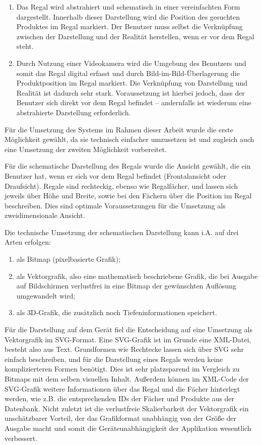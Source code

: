 \begin{enumerate}
	\item Das Regal wird abstrahiert und schematisch in einer vereinfachten Form dargestellt. Innerhalb dieser Darstellung wird die Position des gesuchten Produktes im Regal markiert. Der Benutzer muss selbst die Verknüpfung zwischen der Darstellung und der Realität herstellen, wenn er vor dem Regal steht.
	\item Durch Nutzung einer Videokamera wird die Umgebung des Benutzers und somit das Regal digital erfasst und durch Bild-im-Bild-Überlagerung die Produktposition im Regal markiert. Die Verknüpfung von Darstellung und Realität ist dadurch sehr stark. Voraussetzung ist hierbei jedoch, dass der Benutzer sich direkt vor dem Regal befindet -- andernfalls ist wiederum eine abstrahierte Darstellung erforderlich.
\end{enumerate}

Für die Umsetzung des Systems im Rahmen dieser Arbeit wurde die erste Möglichkeit gewählt, da sie technisch einfacher umzusetzen ist und zugleich auch eine Umsetzung der zweiten Möglichkeit vorbereitet.

Für die schematische Darstellung des Regals wurde die Ansicht gewählt, die ein Benutzer hat, wenn er sich vor dem Regal befindet (Frontalansicht oder Draufsicht). Regale sind rechteckig, ebenso wie Regalfächer, und lassen sich jeweils über Höhe und Breite, sowie bei den Fächern über die Position im Regal beschreiben. Dies sind optimale Voraussetzungen für die Umsetzung als zweidimensionale Ansicht.

Die technische Umsetzung der schematischen Darstellung kann i.A. auf drei Arten erfolgen:

\begin{enumerate}
	\item als Bitmap (pixelbasierte Grafik);
	\item als Vektorgrafik, also eine mathematisch beschriebene Grafik, die bei Ausgabe auf Bildschirmen verlustfrei in eine Bitmap der gewünschten Auflösung umgewandelt wird; 
	\item als \acs{3D}-Grafik, die zusätzlich noch Tiefeninformationen speichert.
\end{enumerate}

Für die Darstellung auf dem Gerät fiel die Entscheidung auf eine Umsetzung als Vektorgrafik im \acs{SVG}-Format. Eine \acs{SVG}-Grafik ist im Grunde eine \acs{XML}-Datei, besteht also aus Text. Grundformen wie Rechtecke lassen sich über \acs{SVG} sehr einfach beschreiben, und für die Darstellung eines Regals werden keine komplizierteren Formen benötigt. Dies ist sehr platzsparend im Vergleich zu Bitmaps mit dem selben visuellen Inhalt. Außerdem können im \acs{XML}-Code der \acs{SVG}-Grafik weitere Informationen über das Regal und die Fächer hinterlegt werden, wie z.B. die entsprechenden IDs der Fächer und Produkte aus der Datenbank. Nicht zuletzt ist die verlustfreie Skalierbarkeit der Vektorgrafik ein unschätzbarer Vorteil, der das Grafikformat unabhängig von der Größe der Ausgabe macht und somit die Geräteunabhängigkeit der Applikation wesentlich verbessert.

